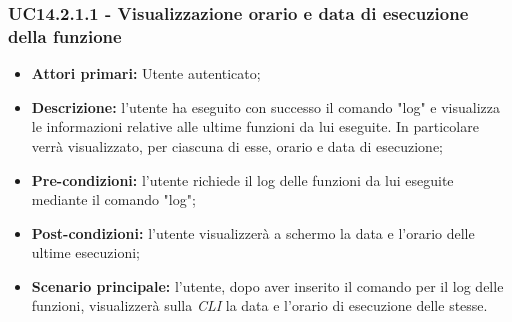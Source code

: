 \subsubsection{UC14.2.1.1 - Visualizzazione orario e data di esecuzione della funzione}
\begin{itemize}
	\item \textbf{Attori primari:} Utente autenticato;
	\item \textbf{Descrizione:} l'utente ha eseguito con successo il comando "log" e visualizza le informazioni relative alle ultime funzioni da lui eseguite. In particolare verrà visualizzato, per ciascuna di esse, orario e data di esecuzione;
	\item \textbf{Pre-condizioni:} l'utente richiede il log delle funzioni da lui eseguite mediante il comando "log";
	\item \textbf{Post-condizioni:} l'utente visualizzerà a schermo la data e l'orario delle ultime esecuzioni;
	\item \textbf{Scenario principale:} l'utente, dopo aver inserito il comando per il log delle funzioni, visualizzerà sulla \textit{CLI\glo} la data e l'orario di esecuzione delle stesse.
\end{itemize}

